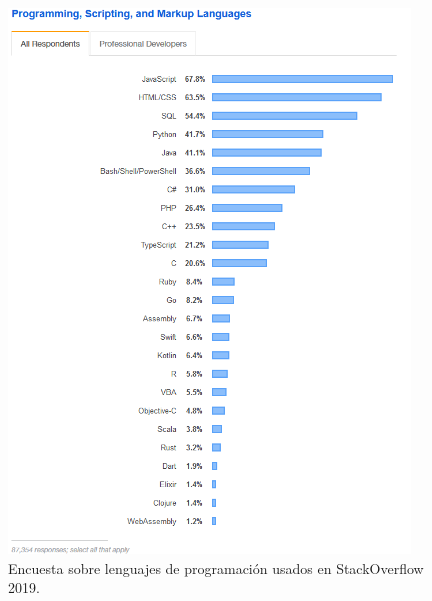 \begin{figure}
    \centering
    \includegraphics[width=0.95\textwidth]{images/chapter1/stackoverflow_language.png}
    \caption{Encuesta sobre lenguajes de programación usados en StackOverflow 2019.}
    \label{fig:Encuesta sobre lenguajes de programación en StackOverflow 2019}
\end{figure}

